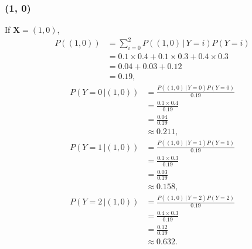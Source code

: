 \documentclass[10pt]{article}
\begin{document}
\subsubsection*{(1, 0)}
If $\textbf{X} = (1, 0)$, 
\begin{align*}
P((1, 0)) &= \sum_{i = 0}^2 P((1, 0) \, | \, Y = i)P(Y = i) \\
             &= 0.1 \times 0.4 + 0.1 \times 0.3 + 0.4 \times 0.3 \\
             &= 0.04 + 0.03 + 0.12 \\
             &= 0.19,
\end{align*}
\begin{align*}
P(Y = 0 \, | (1,0)) &= \frac{P((1, 0) \, | \, Y = 0)P(Y = 0)}{ 0.19 } \\
                           &= \frac{0.1 \times 0.4}{ 0.19 } \\
                           &= \frac{ 0.04 }{ 0.19 } \\
                           &\approx 0.211,
\end{align*}
\begin{align*}
P(Y = 1 \, | (1,0)) &= \frac{ P((1, 0) \, | \, Y = 1)P(Y = 1) }{ 0.19 } \\
                           &= \frac{ 0.1 \times 0.3 }{ 0.19 } \\
                           &= \frac{ 0.03 }{ 0.19 } \\
                           &\approx 0.158,
\end{align*}
\begin{align*}
P(Y = 2 \, | (1,0)) &= \frac{P((1, 0) \, | \, Y = 2)P(Y = 2)}{ 0.19 } \\
                           &= \frac{ 0.4 \times 0.3 }{ 0.19 } \\
                           &= \frac{ 0.12 }{ 0.19 } \\
                           &\approx 0.632.
\end{align*}
\end{document}
